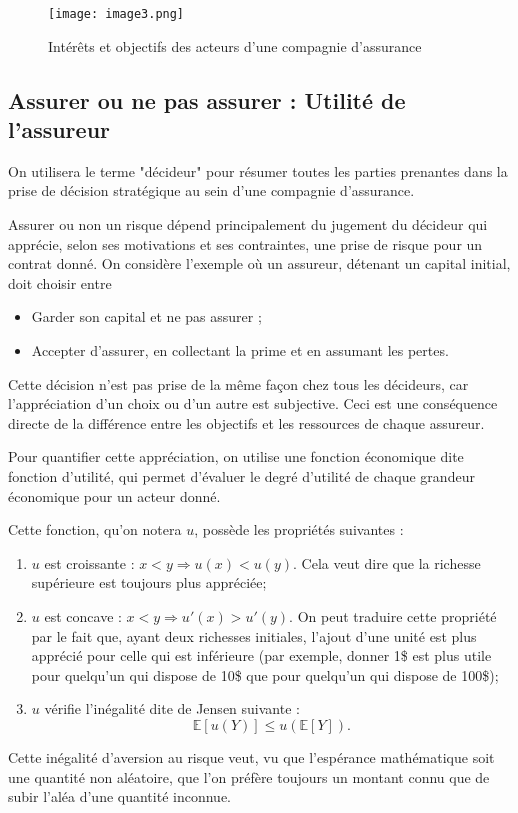 \documentclass[11pt]{article}
\begin{document}
\begin{figure}
\begin{center}
\texttt{[image: image3.png]}
\end{center}
\caption{Intérêts et objectifs des acteurs d'une compagnie d'assurance}
\label{fig:interets}
\end{figure}

\subsection{Assurer ou ne pas assurer : Utilité de l'assureur}

On utilisera le terme "décideur" pour résumer toutes les parties prenantes dans la prise de décision stratégique au sein d'une compagnie d'assurance.

Assurer ou non un risque dépend principalement du jugement du décideur qui apprécie, selon ses motivations et ses contraintes, une prise de risque pour un contrat donné. On considère l'exemple où un assureur, détenant un capital initial, doit choisir entre
\begin{itemize}
\item Garder son capital et ne pas assurer ;
\item Accepter d'assurer, en collectant la prime et en assumant les pertes.
\end{itemize}
Cette décision n'est pas prise de la même façon chez tous les décideurs, car l'appréciation d'un choix ou d'un autre est subjective. Ceci est une conséquence directe de la différence entre les objectifs et les ressources de chaque assureur.

Pour quantifier cette appréciation, on utilise une fonction économique dite fonction d'utilité, qui permet d'évaluer le degré d'utilité de chaque grandeur économique pour un acteur donné. 

Cette fonction, qu'on notera $u$, possède les propriétés suivantes :
\begin{enumerate}[label=(\roman*)]
\item $u$ est croissante :  $x<y \Rightarrow u(x)<u(y)$. Cela veut dire que la richesse supérieure est toujours plus appréciée;
\item $u$ est concave :  $x<y \Rightarrow u'(x)>u'(y)$. On peut traduire cette propriété par le fait que, ayant deux richesses initiales, l'ajout d'une unité est plus apprécié pour celle qui est inférieure (par exemple, donner 1\$ est plus utile pour quelqu'un qui dispose de 10\$ que pour quelqu'un qui dispose de 100\$);
\item $u$ vérifie l'inégalité dite de Jensen suivante :
\begin{equation*}
\mathbb{E}[u(Y)] \leq u\left(\mathbb{E}[Y]\right).
\end{equation*}
\end{enumerate}
Cette inégalité d'aversion au risque veut, vu que l'espérance mathématique soit une quantité non aléatoire, que l'on préfère toujours un montant connu que de subir l'aléa d'une quantité inconnue.
\end{document}
